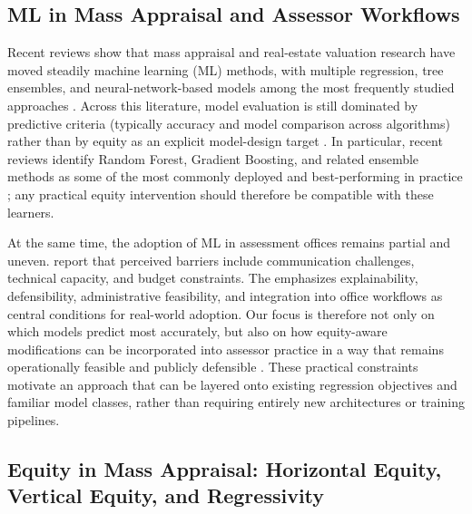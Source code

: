 \documentclass[12pt, draft]{article}
\theoremstyle{plain}
\theoremstyle{definition}
\newcommand{\1}{\mathbf{1}}
\begin{document}
\subsection{ML in Mass Appraisal and Assessor Workflows}

Recent reviews show that mass appraisal and real-estate valuation research have moved steadily machine learning (ML) methods, with multiple regression, tree ensembles, and neural-network-based models among the most frequently studied approaches \cite{WangLi2019,Rootetal2023,Zilli2024,purdueAssessingTechniques}. Across this literature, model evaluation is still dominated by predictive criteria (typically accuracy and model comparison across algorithms) rather than by equity as an explicit model-design target \cite{WangLi2019,Rootetal2023,Zilli2024}. In particular, recent reviews identify Random Forest, Gradient Boosting, and related ensemble methods as some of the most commonly deployed and best-performing in practice \cite{Rootetal2023,Sevgen2024100111,Zilli2024}; any practical equity intervention should therefore be compatible with these learners.





 
At the same time, the adoption of ML in assessment offices remains partial and uneven. \textcite{BidansetRakow2022} report that perceived barriers include communication challenges, technical capacity, and budget constraints. The \textcite{IAAOAITaskForce2022} emphasizes explainability, defensibility, administrative feasibility, and integration into office workflows as central conditions for real-world adoption. Our focus is therefore not only on which models predict most accurately, but also on how equity-aware modifications can be incorporated into assessor practice in a way that remains operationally feasible and publicly defensible \cite{IAAOAITaskForce2022,BidansetRakow2022}. These practical constraints motivate an approach that can be layered onto existing regression objectives and familiar model classes, rather than requiring entirely new architectures or training pipelines.






\subsection{Equity in Mass Appraisal: Horizontal Equity, Vertical Equity, and Regressivity}
\end{document}
